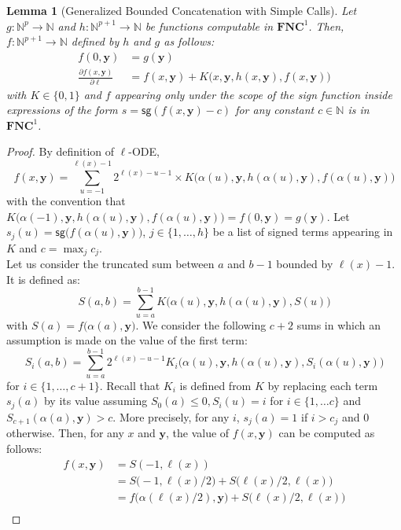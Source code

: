 \documentclass[11pt, oneside]{article}
\newenvironment{toappendix}{}{}
\newcommand{\fun}[1]{\mathsf{#1}}
\newcommand{\Nat}{\mathbb{N}}
\newcommand{\NC}{\mathbf{FNC}}
\newcommand{\tu}[1]{\mathbf{#1}}
\newtheorem{lemma}{Lemma}
\theoremstyle{definition}
\begin{document}
\begin{toappendix}
\begin{lemma}[Generalized Bounded Concatenation with Simple Calls]\label{lemma:gBC}
    Let $g:\Nat^p\to \Nat$ and $h:\Nat^{p+1}\to \Nat$ be functions computable in $\NC^1$.
    Then, $f:\Nat^{p+1}\to \Nat$ defined by $h$ and $g$ as follows:
    \begin{align*}
        f(0, \tu y) &= g(\tu y) \\
        \frac{\partial f(x, \tu y)}{\partial \ell} &= f(x, \tu y) + K\big(x, \tu y, h(x, \tu y), f(x, \tu y)\big)
    \end{align*}
    with $K\in \{0,1\}$ and $f$ appearing only under the scope of the sign function inside expressions of the form $s=\fun{sg}(f(x,\tu y) - c)$ for any constant $c\in \Nat$ is in $\NC^1$.
\end{lemma}
\begin{proof}
    By definition of $\ell$-ODE,
    $$
    f(x, \tu y) = \sum^{\ell(x)-1}_{u=-1} 2^{\ell(x)-u-1} \times K\big(\alpha(u), \tu y, h(\alpha(u), \tu y), f(\alpha(u), \tu y)\big)
    $$
    with the convention that $K\big(\alpha(-1), \tu y, h(\alpha(u), \tu y), f(\alpha(u), \tu y)\big)= f(0, \tu y)=g(\tu y)$.
    Let $s_j(u)=\fun{sg}\big(f(\alpha(u), \tu y)\big)$, $j\in \{1, \dots, h\}$ be a list of signed terms appearing in $K$ and $c=\max_jc_j$.
    \\
    Let us consider the truncated sum between $a$ and $b-1$ bounded by $\ell(x)-1$.
    It is defined as:
    $$
    S(a,b) = \sum^{b-1}_{u=a} K\big(\alpha(u), \tu y, h(\alpha(u), \tu y), S(u)\big)
    $$
    with $S(a)=f\big(\alpha(a), \tu y\big)$.
    We consider the following $c+2$ sums in which an assumption is made on the value of the first term:
    $$
    S_i(a,b) = \sum^{b-1}_{u=a} 2^{\ell(x)-u-1}K_i\big(\alpha(u), \tu y, h(\alpha(u), \tu y), S_i(\alpha(u), \tu y)\big)
    $$
    for $i\in \{1,\dots, c+1\}$.
    Recall that $K_i$ is defined from $K$ by replacing each term $s_j(a)$ by its value assuming $S_0(a)\leq 0, S_i(u)=i$ for $i\in \{1,\dots c\}$ and $S_{c+1}(\alpha(a), \tu y)>c$.
    More precisely, for any $i$, $s_j(a)=1$ if $i>c_j$ and 0 otherwise.
    Then, for any $x$ and $\tu y$, the value of $f(x, \tu y)$ can be computed as follows:
    \begin{align*}
        f(x, \tu y) &= S(-1, \ell(x)) \\
        &= S\big(-1, \ell(x)/2\big) + S\big(\ell(x)/2, \ell(x)\big) \\
        &= f\big(\alpha(\ell(x)/2), \tu y\big) + S\big(\ell(x)/2, \ell(x)\big) \\

\end{align*}
\end{proof}
\end{toappendix}
\end{document}
